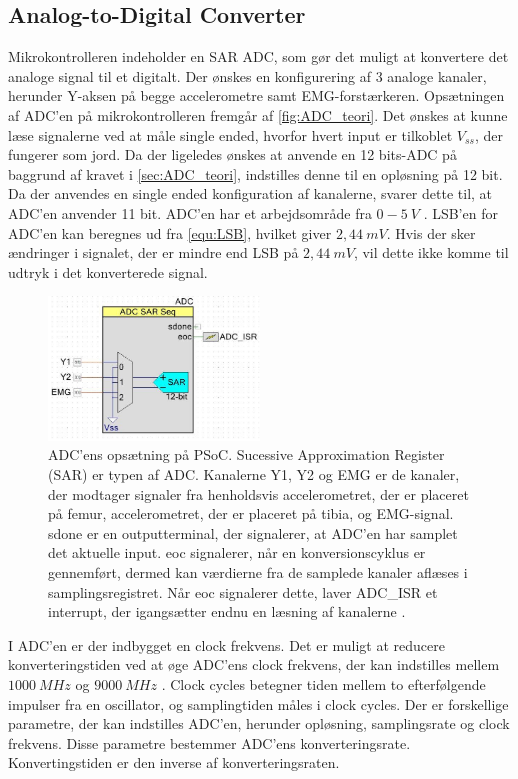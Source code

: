 \subsection{Analog-to-Digital Converter} \label{sec:ADC_imp}
Mikrokontrolleren indeholder en SAR ADC, som gør det muligt at konvertere det analoge signal til et digitalt. Der ønskes en konfigurering af 3 analoge kanaler, herunder Y-aksen på begge accelerometre samt EMG-forstærkeren. Opsætningen af ADC'en på mikrokontrolleren fremgår af \autoref{fig:ADC_teori}. Det ønskes at kunne læse signalerne ved at måle single ended, hvorfor hvert input er tilkoblet $V_{ss}$, der fungerer som jord. Da der ligeledes ønskes at anvende en 12 bits-ADC på baggrund af kravet i \autoref{sec:ADC_teori}, indstilles denne til en opløsning på 12 bit. Da der anvendes en single ended konfiguration af kanalerne, svarer dette til, at ADC'en anvender 11 bit. ADC'en har et arbejdsområde fra $0-5~V$ \citep{ADC2014}. LSB'en for ADC'en kan beregnes ud fra \autoref{equ:LSB}, hvilket giver $2,44~mV$. Hvis der sker ændringer i signalet, der er mindre end LSB på $2,44~mV$, vil dette ikke komme til udtryk i det konverterede signal. 


\begin{figure}[H]
\centering
\includegraphics[width=0.5\textwidth]{figures/implementering/ADC_imp.jpg}
\caption{ADC'ens opsætning på PSoC. Sucessive Approximation Register (SAR) er typen af ADC. Kanalerne Y1, Y2 og EMG er de kanaler, der modtager signaler fra henholdsvis accelerometret, der er placeret på femur, accelerometret, der er placeret på tibia, og EMG-signal. sdone er en outputterminal, der signalerer, at ADC'en har samplet det aktuelle input. eoc signalerer, når en konversionscyklus er gennemført, dermed kan værdierne fra de samplede kanaler aflæses i samplingsregistret. Når eoc signalerer dette, laver ADC\_ISR et interrupt, der igangsætter endnu en læsning af kanalerne \citep{ADC2014}.}
\label{fig:ADC_teori}
\end{figure}

\noindent
I ADC'en er der indbygget en clock frekvens. Det er muligt at reducere konverteringstiden ved at øge ADC'ens clock frekvens, der kan indstilles mellem $1000~MHz$ og $9000~MHz$ \citep{ADC2014}. Clock cycles betegner tiden mellem to efterfølgende impulser fra en oscillator, og samplingtiden måles i clock cycles. Der er forskellige parametre, der kan indstilles ADC'en, herunder opløsning, samplingsrate og clock frekvens. Disse parametre bestemmer ADC'ens konverteringsrate. Konvertingstiden er den inverse af konverteringsraten. 

